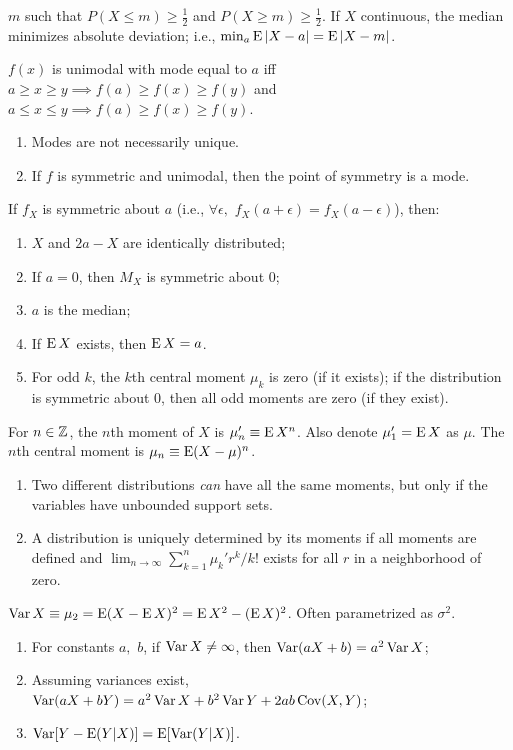 \documentclass[8pt,letterpaper, landscape]{extarticle} %
\begin{document}
\begin{multicols}{3}
\begin{description}
 $ m $ such that $ P (X \leq m) \geq \tfrac{1}{2} $ and $ P (X \geq m) \geq \tfrac{1}{2} $. If $ X $ continuous, the median minimizes absolute deviation; i.e., $ \min_a \operatorname{E} |X-a| = \operatorname{E}|X - m| $.

 $ f(x) $ is unimodal with mode equal to $ a $ iff $ a \geq x \geq y \implies f(a) \geq f(x) \geq f(y) $ and $ a \leq x \leq y \implies f(a) \geq f(x) \geq f(y) $.
\begin{enumerate}
\item Modes are not necessarily unique.
\item If $ f $ is symmetric and unimodal, then the point of symmetry is a mode.
\end{enumerate}

 If $ f_X $ is symmetric about $ a $ (i.e., $ \forall \epsilon, $ $ f_X(a + \epsilon) = f_X(a - \epsilon) $), then:
\begin{enumerate}
\item $ X $ and $ 2a - X $ are identically distributed;
\item If $ a = 0 $, then $ M_X $ is symmetric about 0;
\item $ a $ is the median;
\item If $ \operatorname{E} X $ exists, then $ \operatorname{E} X = a $.
\item For odd $ k $, the $ k $th central moment $ \mu_k $ is zero (if it exists); if the distribution is symmetric about $ 0 $, then all odd moments are zero (if they exist).
\end{enumerate}

 For $ n \in \mathbb{Z} $, the $ n $th moment of $ X $ is $ \mu_{n}' \equiv \operatorname{E} X^n $. Also denote $ \mu_{1}' = \operatorname{E} X $ as $ \mu $. The $ n $th central moment is $ \mu_n \equiv \operatorname{E}(X - \mu)^n $.
\begin{enumerate}
\item Two different distributions \textit{can} have all the same moments, but only if the variables have unbounded support sets.
\item A distribution is uniquely determined by its moments if all moments are defined and $ \lim_{n \to \infty} \sum_{k=1}^{n} \mu_{k}' r^k / k! $ exists for all $ r $ in a neighborhood of zero.
\end{enumerate}

 $ \operatorname{Var} X \equiv \mu_2 = \operatorname{E} (X - \operatorname{E} X)^2 = \operatorname{E} X^2 - (\operatorname{E} X)^2 $. Often parametrized as $ \sigma^2 $.
\begin{enumerate}
\item For constants $ a, $ $ b $, if $ \operatorname{Var} X \neq \infty $, then $ \operatorname{Var} (aX+b) = a^2 \operatorname{Var} X $;
\item Assuming variances exist, $ \operatorname{Var} (aX + bY) = a^2 \operatorname{Var} X + b^2 \operatorname{Var} Y + 2ab \operatorname{Cov} (X,Y) $;
\item $ \operatorname{Var} [Y - \operatorname{E} (Y|X)] = \operatorname{E} [\operatorname{Var}(Y|X)] $.
\end{enumerate}


\end{description}
\end{multicols}
\end{document}
